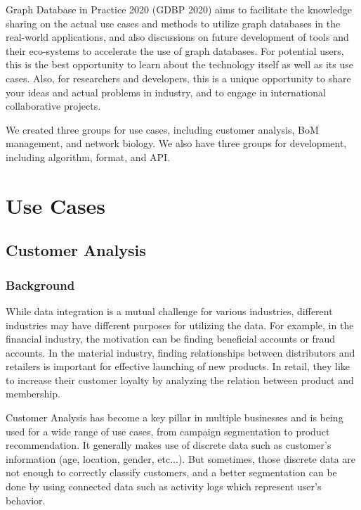 \documentclass[runningheads]{llncs}
\begin{document}
Graph Database in Practice 2020 (GDBP 2020) aims to facilitate the knowledge sharing on the actual use cases and methods to utilize graph databases in the real-world applications, and also discussions on future development of tools and their eco-systems to accelerate the use of graph databases. For potential users, this is the best opportunity to learn about the technology itself as well as its use cases. Also, for researchers and developers, this is a unique opportunity to share your ideas and actual problems in industry, and to engage in international collaborative projects.

We created three groups for use cases, including customer analysis, BoM management, and network biology. We also have three groups for development, including algorithm, format, and API.

\section{Use Cases}

\subsection{Customer Analysis}

\subsubsection{Background}

While data integration is a mutual challenge for various industries, different industries may have different purposes for utilizing the data. For example, in the financial industry, the motivation can be finding beneficial accounts or fraud accounts. In the material industry, finding relationships between distributors and retailers is important for effective launching of new products. In retail, they like to increase their customer loyalty by analyzing the relation between product and membership.

Customer Analysis has become a key pillar in multiple businesses and is being used for a wide range of use cases, from campaign segmentation to product recommendation. It generally makes use of discrete data such as customer’s information (age, location, gender, etc...). But sometimes, those discrete data are not enough to correctly classify customers, and a better segmentation can be done by using connected data such as activity logs which represent user’s behavior.
\end{document}
